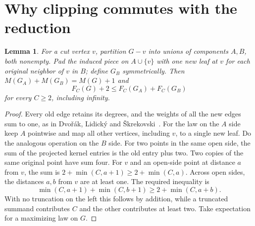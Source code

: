 \documentclass[11pt,a4paper]{article}
\newtheorem{lemma}[theorem]{Lemma}\newtheorem{corollary}[theorem]{Corollary}
\begin{document}
\section{Why clipping commutes with the reduction}
\begin{lemma}\label{p12-lem:split}
For a cut vertex $v$, partition $G-v$ into unions of components $A,B$, both nonempty. Pad the induced piece on $A\cup\{v\}$ with one new leaf at $v$ for each original neighbor of $v$ in $B$; define $G_B$ symmetrically. Then $M(G_A)+M(G_B)=M(G)+1$ and
\[
 F_C(G)+2\le F_C(G_A)+F_C(G_B)
\]
for every $C\ge2$, including infinity.
\end{lemma}
\begin{proof}
Every old edge retains its degrees, and the weights of all the new edges sum to one, as in Dvo\v{r}\'ak, Lidick\'y and \v{S}krekovski~\cite[Lemma~4]{p12-DLS}. For the law on the $A$ side keep $A$ pointwise and map all other vertices, including $v$, to a single new leaf. Do the analogous operation on the $B$ side. For two points in the same open side, the sum of the projected kernel entries is the old entry plus two. Two copies of the same original point have sum four. For $v$ and an open-side point at distance $a$ from $v$, the sum is $2+\min(C,a+1)\ge2+\min(C,a)$. Across open sides, the distances $a,b$ from $v$ are at least one. The required inequality is
\[
 \min(C,a+1)+\min(C,b+1)\ge2+\min(C,a+b).
\]
With no truncation on the left this follows by addition, while a truncated summand contributes $C$ and the other contributes at least two. Take expectation for a maximizing law on $G$.
\end{proof}
\end{document}
